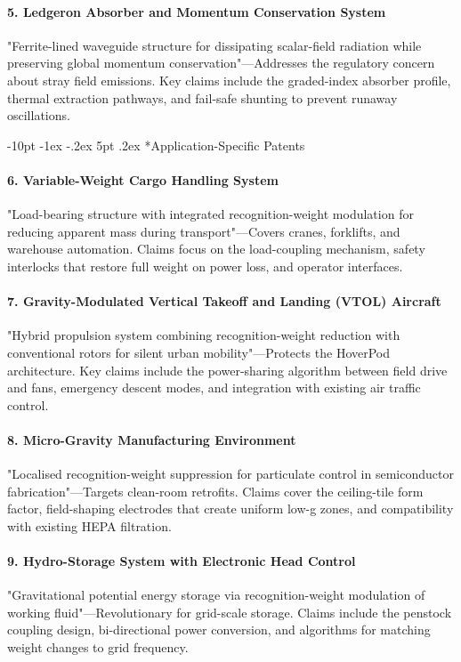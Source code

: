 \documentclass[12pt,letterpaper]{book}
\makeatletter
\renewcommand\section{\@startsection{section}{1}{\z@}%
  {-8pt \@plus -1ex \@minus -.2ex}%
  {4pt \@plus.2ex}%
  {\normalfont\large\bfseries}}
\renewcommand\section{\@startsection {section}{1}{\z@}%
                {-10pt \@plus -1ex \@minus -.2ex}%
                {5pt \@plus.2ex}%
                {\normalfont\large\bfseries}}
\makeatother
\begin{document}
\paragraph{5. Ledgeron Absorber and Momentum Conservation System}
"Ferrite-lined waveguide structure for dissipating scalar-field radiation while preserving global momentum conservation"—Addresses the regulatory concern about stray field emissions.  Key claims include the graded-index absorber profile, thermal extraction pathways, and fail-safe shunting to prevent runaway oscillations.

\section*{Application-Specific Patents}

\paragraph{6. Variable-Weight Cargo Handling System}
"Load-bearing structure with integrated recognition-weight modulation for reducing apparent mass during transport"—Covers cranes, forklifts, and warehouse automation.  Claims focus on the load-coupling mechanism, safety interlocks that restore full weight on power loss, and operator interfaces.

\paragraph{7. Gravity-Modulated Vertical Takeoff and Landing (VTOL) Aircraft}
"Hybrid propulsion system combining recognition-weight reduction with conventional rotors for silent urban mobility"—Protects the HoverPod architecture.  Key claims include the power-sharing algorithm between field drive and fans, emergency descent modes, and integration with existing air traffic control.

\paragraph{8. Micro-Gravity Manufacturing Environment}
"Localised recognition-weight suppression for particulate control in semiconductor fabrication"—Targets clean-room retrofits.  Claims cover the ceiling-tile form factor, field-shaping electrodes that create uniform low-g zones, and compatibility with existing HEPA filtration.

\paragraph{9. Hydro-Storage System with Electronic Head Control}
"Gravitational potential energy storage via recognition-weight modulation of working fluid"—Revolutionary for grid-scale storage.  Claims include the penstock coupling design, bi-directional power conversion, and algorithms for matching weight changes to grid frequency.
\end{document}
